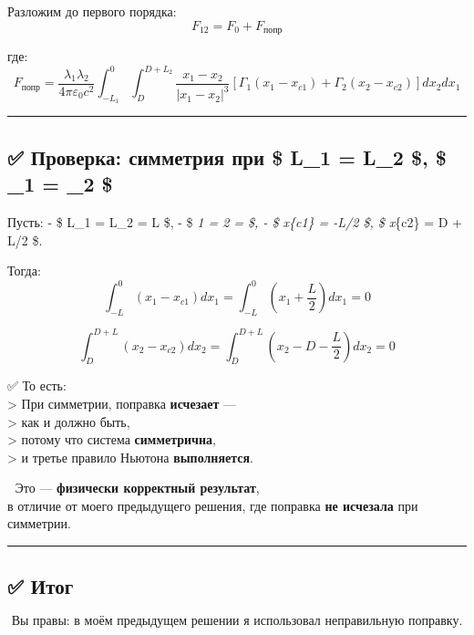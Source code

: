 \documentclass[11pt]{article}
\begin{document}
Разложим до первого порядка: \[
F_{12} = F_0 + F_{\text{попр}}
\]

где: \[
F_{\text{попр}} = \frac{\lambda_1 \lambda_2}{4\pi\varepsilon_0 c^2} \int_{-L_1}^0 \int_{D}^{D+L_2} \frac{x_1 - x_2}{|x_1 - x_2|^3} \left[ \Gamma_1 (x_1 - x_{c1}) + \Gamma_2 (x_2 - x_{c2}) \right] dx_2 dx_1
\]

\begin{center}\rule{0.5\linewidth}{\linethickness}\end{center}

\subsection{\texorpdfstring{✅ Проверка: симметрия при \$ L\_1 = L\_2 \$,
\$ \Gamma\_1 = \Gamma\_2
\$}{✅ Проверка: симметрия при \$ L\_1 = L\_2 \$, \$ \_1 = \_2 \$}}\label{ux43fux440ux43eux432ux435ux440ux43aux430-ux441ux438ux43cux43cux435ux442ux440ux438ux44f-ux43fux440ux438-l_1-l_2-_1-_2}

Пусть: - \$ L\_1 = L\_2 = L \$, - \$ \Gamma\emph{1 = \Gamma\emph{2 =
\Gamma \$, - \$ x}\{c1\} = -L/2 \$, \$ x}\{c2\} = D + L/2 \$.

Тогда: \[
\int_{-L}^0 (x_1 - x_{c1}) dx_1 = \int_{-L}^0 \left(x_1 + \frac{L}{2}\right) dx_1 = 0
\]

\[
\int_{D}^{D+L} (x_2 - x_{c2}) dx_2 = \int_{D}^{D+L} \left(x_2 - D - \frac{L}{2}\right) dx_2 = 0
\]

✅ То есть:\\
\textgreater{} При симметрии, поправка \textbf{исчезает} ---\\
\textgreater{} как и должно быть,\\
\textgreater{} потому что система \textbf{симметрична},\\
\textgreater{} и третье правило Ньютона \textbf{выполняется}.

📌 Это --- \textbf{физически корректный результат},\\
в отличие от моего предыдущего решения, где поправка \textbf{не
исчезала} при симметрии.

\begin{center}\rule{0.5\linewidth}{\linethickness}\end{center}

\subsection{✅ Итог}\label{ux438ux442ux43eux433}

\[
\boxed{
\text{Вы правы: в моём предыдущем решении я использовал } \textbf{неправильную поправку}.
}
\]
\end{document}
